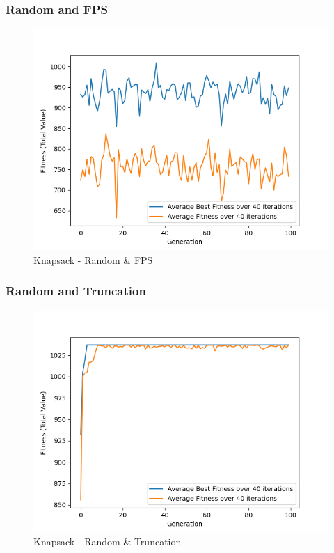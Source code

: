 \documentclass[11pt, letterpaper]{article}
\begin{document}
\subsubsection {Random and FPS}
\begin{figure}[H]
    \centering
    \includegraphics[scale = 0.6]{images/knapsack_rd_fp.png}
    \caption {Knapsack - Random \& FPS}
    \label {fig:kpRB}
\end{figure}

\subsubsection {Random and Truncation}
\begin{figure}[H]
    \centering
    \includegraphics[scale = 0.6]{images/knapsack_rd_tr.png}
    \caption {Knapsack - Random \& Truncation}
    \label {fig:kpRT}
\end{figure}
\end{document}
